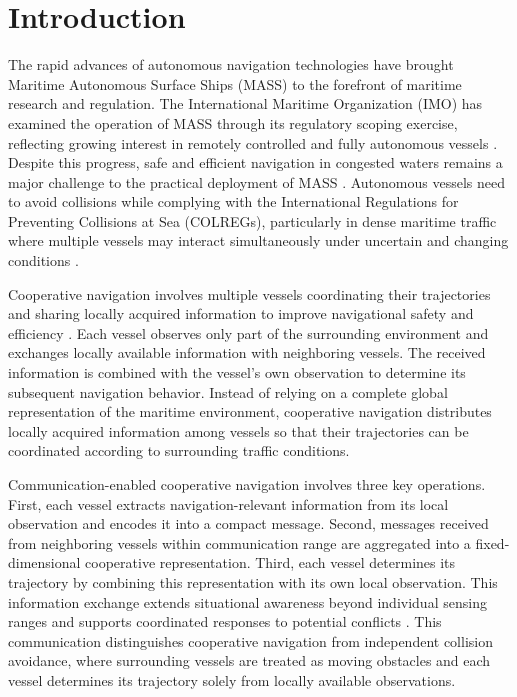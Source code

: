 \documentclass[final,5p,times,twocolumn]{elsarticle}
\begin{document}
\section{Introduction}
{\color{violet}
The rapid advances of autonomous navigation technologies have brought Maritime Autonomous Surface Ships (MASS) to the forefront of maritime research and regulation. The International Maritime Organization (IMO) has examined the operation of MASS through its regulatory scoping exercise, reflecting growing interest in remotely controlled and fully autonomous vessels \cite{1}. Despite this progress, safe and efficient navigation in congested waters remains a major challenge to the practical deployment of MASS \cite{2}. Autonomous vessels need to avoid collisions while complying with the International Regulations for Preventing Collisions at Sea (COLREGs), particularly in dense maritime traffic where multiple vessels may interact simultaneously under uncertain and changing conditions \cite{3}.

Cooperative navigation involves multiple vessels coordinating their trajectories and sharing locally acquired information to improve navigational safety and efficiency \cite{4}. Each vessel observes only part of the surrounding environment and exchanges locally available information with neighboring vessels. The received information is combined with the vessel's own observation to determine its subsequent navigation behavior. Instead of relying on a complete global representation of the maritime environment, cooperative navigation distributes locally acquired information among vessels so that their trajectories can be coordinated according to surrounding traffic conditions.

Communication-enabled cooperative navigation involves three key operations. First, each vessel extracts navigation-relevant information from its local observation and encodes it into a compact message. Second, messages received from neighboring vessels within communication range are aggregated into a fixed-dimensional cooperative representation. Third, each vessel determines its trajectory by combining this representation with its own local observation. This information exchange extends situational awareness beyond individual sensing ranges and supports coordinated responses to potential conflicts \cite{5,6}. This communication distinguishes cooperative navigation from independent collision avoidance, where surrounding vessels are treated as moving obstacles and each vessel determines its trajectory solely from locally available observations. 

}
\end{document}
